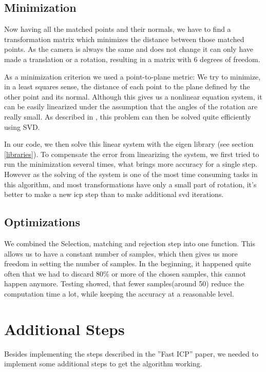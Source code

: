 \documentclass[10pt,twocolumn,letterpaper]{article}
\begin{document}
\subsection{Minimization}
\label{minimization}
Now having all the matched points and their normals, we have to find a transformation matrix which minimizes the distance between those matched points.
As the camera is always the same and does not change it can only have made a translation or a rotation, resulting in a matrix with 6 degrees of freedom.

As a minimization criterion we used a point-to-plane metric: We try to minimize, in a least squares sense, the distance of each point to the plane
defined by the other point and its normal. Although this gives us a nonlinear equation system, it can be easily linearized under the assumption
that the angles of the rotation are really small. As described in \cite{ptp}, this problem can then be solved quite efficiently using SVD.

In our code, we then solve this linear system with the eigen library (see section \ref{libraries}).
To compensate the error from linearizing the system, we first tried to run the minimization several times, what brings more accuracy for a single step. 
However as the solving of the system is one of the most time consuming tasks in this algorithm,
and most transformations have only a small part of rotation, it's better to make a new icp step than to make additional svd iterations.

\subsection{Optimizations}
We combined the Selection, matching and rejection step into one function. This allows us to have a constant number of samples,
which then gives us more freedom in setting the number of samples. In the beginning, it happened quite often that we had to discard
80\% or more of the chosen samples, this cannot happen anymore. Testing showed, that fewer samples(around 50) reduce the computation
time a lot, while keeping the accuracy at a reasonable level.

\section{Additional Steps}
Besides implementing the steps described in the ''Fast ICP'' \cite{fasticp} paper,
we needed to implement some additional steps to get the algorithm working.
\end{document}
